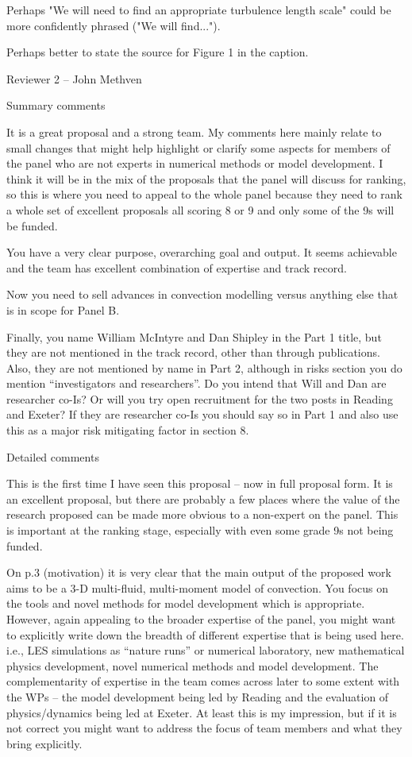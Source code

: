 \documentclass[11pt,a4paper]{article}
\begin{document}
{{\color{blue} Perhaps "We will need to find an appropriate turbulence length scale" could be more confidently phrased ("We will find..."). }

{\color{blue} Perhaps better to state the source for Figure 1 in the caption. }

\vspace{10mm}

{\color{blue}
Reviewer 2 – John Methven

Summary comments 
 
It is a great proposal and a strong team. My comments here mainly relate to small changes that might help highlight or clarify some aspects for members of the panel who are not experts in numerical methods or model development. I think it will be in the mix of the proposals that the panel will discuss for ranking, so this is where you need to appeal to the whole panel because they need to rank a whole set of excellent proposals all scoring 8 or 9 and only some of the 9s will be funded. 

You have a very clear purpose, overarching goal and output. It seems achievable and the team has excellent combination of expertise and track record.} Now you need to sell advances in convection modelling versus anything else that is in scope for Panel B.  

Finally, you name William McIntyre and Dan Shipley in the Part 1 title, but they are not mentioned in the track record, other than through publications. Also, they are not mentioned by name in Part 2, although in risks section you do mention “investigators and researchers”. Do you intend that Will and Dan are researcher co-Is? Or will you try open recruitment for the two posts in Reading and Exeter? If they are researcher co-Is you should say so in Part 1 and also use this as a major risk mitigating factor in section 8. 
 
Detailed comments 

This is the first time I have seen this proposal – now in full proposal form. It is an excellent proposal, but there are probably a few places where the value of the research proposed can be made more obvious to a non-expert on the panel. This is important at the ranking stage, especially with even some grade 9s not being funded. 

{\color{blue}
On p.3 (motivation) it is very clear that the main output of the proposed work aims to be a 3-D multi-fluid, multi-moment model of convection. You focus on the tools and novel methods for model development which is appropriate. However, again appealing to the broader expertise of the panel, you might want to explicitly write down the breadth of different expertise that is being used here. i.e., LES simulations as “nature runs” or numerical laboratory, new mathematical physics development, novel numerical methods and model development. The complementarity of expertise in the team comes across later to some extent with the WPs – the model development being led by Reading and the evaluation of physics/dynamics being led at Exeter. At least this is my impression, but if it is not correct} you might want to address the focus of team members and what they bring explicitly. 

}
\end{document}
